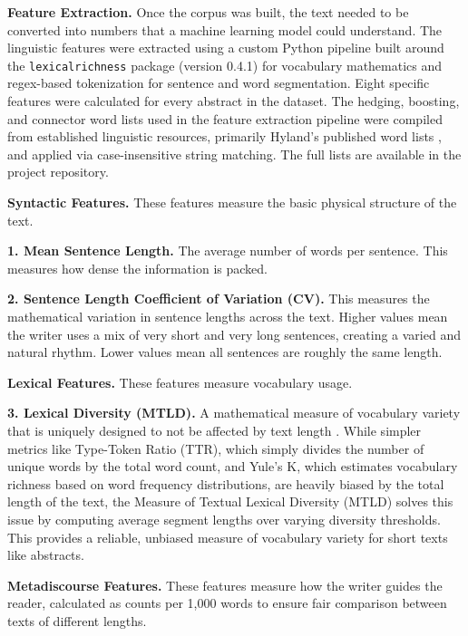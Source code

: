 \documentclass{article}
\begin{document}
\textbf{Feature Extraction.} Once the corpus was built, the text needed to be converted into numbers that a machine learning model could understand. The linguistic features were extracted using a custom Python pipeline built around the \texttt{lexicalrichness} package (version 0.4.1) for vocabulary mathematics and regex-based tokenization for sentence and word segmentation. Eight specific features were calculated for every abstract in the dataset. The hedging, boosting, and connector word lists used in the feature extraction pipeline were compiled from established linguistic resources, primarily Hyland's published word lists \cite{ref2}, and applied via case-insensitive string matching. The full lists are available in the project repository.

\textbf{Syntactic Features.} These features measure the basic physical structure of the text.

\vspace{-3pt}
\textbf{1. Mean Sentence Length.} The average number of words per sentence. This measures how dense the information is packed.

\vspace{-3pt}
\textbf{2. Sentence Length Coefficient of Variation (CV).} This measures the mathematical variation in sentence lengths across the text. Higher values mean the writer uses a mix of very short and very long sentences, creating a varied and natural rhythm. Lower values mean all sentences are roughly the same length.

\textbf{Lexical Features.} These features measure vocabulary usage.

\vspace{-3pt}
\textbf{3. Lexical Diversity (MTLD).} A mathematical measure of vocabulary variety that is uniquely designed to not be affected by text length \cite{ref11,ref18}. While simpler metrics like Type-Token Ratio (TTR), which simply divides the number of unique words by the total word count, and Yule's K, which estimates vocabulary richness based on word frequency distributions, are heavily biased by the total length of the text, the Measure of Textual Lexical Diversity (MTLD) solves this issue by computing average segment lengths over varying diversity thresholds. This provides a reliable, unbiased measure of vocabulary variety for short texts like abstracts.

\textbf{Metadiscourse Features.} These features measure how the writer guides the reader, calculated as counts per 1,000 words to ensure fair comparison between texts of different lengths.
\end{document}

